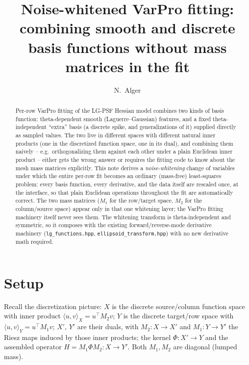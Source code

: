 \documentclass[11pt]{article}
\title{Noise-whitened VarPro fitting: combining smooth and discrete\\
       basis functions without mass matrices in the fit}
\author{N.~Alger}
\date{}
\newcommand{\Mone}{M_1}
\newcommand{\Mtwo}{M_2}
\begin{document}
\maketitle

\begin{abstract}
\noindent
Per-row VarPro fitting of the LG-PSF Hessian model combines two kinds of basis
function: theta-dependent smooth (Laguerre--Gaussian) features, and a fixed
theta-independent ``extra'' basis (a discrete spike, and generalizations of
it) supplied directly as sampled values. The two live in different spaces
with different natural inner products (one in the discretized function space,
one in its dual), and combining them naively -- e.g.\ orthogonalizing them
against each other under a plain Euclidean inner product -- either gets the
wrong answer or requires the fitting code to know about the mesh mass
matrices explicitly. This note derives a \emph{noise-whitening} change of
variables under which the entire per-row fit becomes an ordinary
(mass-free) least-squares problem: every basis function, every derivative,
and the data itself are rescaled once, at the interface, so that plain
Euclidean operations throughout the fit are automatically correct. The two
mass matrices ($M_1$ for the row/target space, $M_2$ for the column/source
space) appear only in that one whitening layer; the VarPro fitting machinery
itself never sees them. The whitening transform is theta-independent and
symmetric, so it composes with the existing forward/reverse-mode derivative
machinery (\texttt{lg\_functions.hpp}, \texttt{ellipsoid\_transform.hpp}) with
no new derivative math required.
\end{abstract}

\section{Setup}

Recall the discretization picture: $X$ is the discrete
source/column function space with inner product $\langle u,v\rangle_X =
u^\top \Mtwo v$; $Y$ is the discrete target/row space with $\langle
u,v\rangle_Y = u^\top \Mone v$; $X'$, $Y'$ are their duals, with $\Mtwo:
X\to X'$ and $\Mone: Y\to Y'$ the Riesz maps induced by those inner
products; the kernel $\Phi: X'\to Y$ and the assembled operator $H = \Mone
\Phi \Mtwo : X \to Y'$. Both $\Mone,\Mtwo$ are diagonal (lumped mass).
\end{document}
